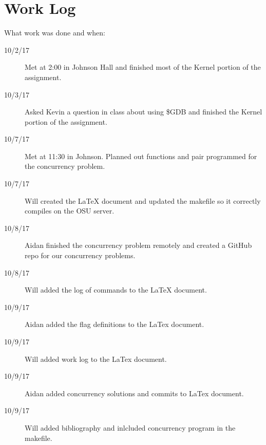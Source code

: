 \documentclass[10pt,letterpaper,draftclsnofoot,onecolumn]{IEEEtran}
\begin{document}
\section{Work Log}
\noindent What work was done and when:
\begin{description}
\item [10/2/17] Met at 2:00 in Johnson Hall and finished most of the Kernel portion of the assignment.
\item [10/3/17] Asked Kevin a question in class about using \$GDB and finished the Kernel portion of the assignment. 
\item [10/7/17] Met at 11:30 in Johnson. Planned out functions and pair programmed for the concurrency problem.
\item [10/7/17] Will created the LaTeX document and updated the makefile so it correctly compiles on the OSU server. 
\item [10/8/17] Aidan finished the concurrency problem remotely and created a GitHub repo for our concurrency problems. 
\item [10/8/17] Will added the log of commands to the LaTeX document. 
\item [10/9/17] Aidan added the flag definitions to the LaTex document. 
\item [10/9/17] Will added work log to the LaTex document. 
\item [10/9/17] Aidan added concurrency solutions and commits to LaTex document.
\item [10/9/17] Will added bibliography and inlcluded concurrency program in the makefile.
\end{description}



\end{document}
